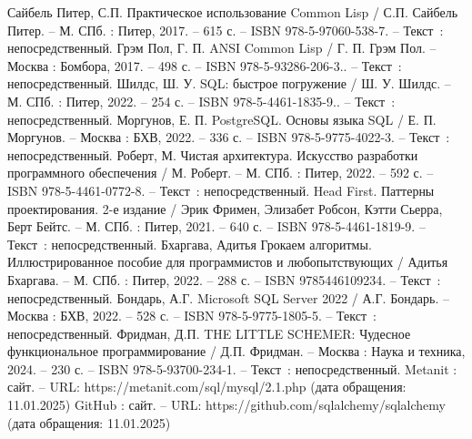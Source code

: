 
\begin{thebibliography}{9}

     Сайбель Питер, С.П. Практическое использование Common Lisp / С.П. Сайбель Питер. – М. СПб. : Питер, 2017. – 615 с. – ISBN 978-5-97060-538-7. – Текст~: непосредственный.
     Грэм Пол, Г. П. ANSI Common Lisp / Г. П. Грэм Пол. – Москва : Бомбора, 2017. – 498 с. – ISBN 978-5-93286-206-3.. – Текст~: непосредственный.
     Шилдс, Ш. У. SQL: быстрое погружение / Ш. У. Шилдс. – М. СПб. : Питер, 2022. – 254 с. – ISBN 978-5-4461-1835-9.. – Текст~: непосредственный.
    	Моргунов, Е. П. PostgreSQL. Основы языка SQL / Е. П. Моргунов. – Москва : БХВ, 2022. – 336 с. – ISBN 978-5-9775-4022-3. – Текст~: непосредственный.
		Роберт, М. Чистая архитектура. Искусство разработки программного обеспечения / М. Роберт. – М. СПб. : Питер, 2022. – 592 с. – ISBN 978-5-4461-0772-8. – Текст~: непосредственный.
		Head First. Паттерны проектирования. 2-е издание / Эрик Фримен, Элизабет Робсон, Кэтти Сьерра, Берт Бейтс. – М. СПб. : Питер, 2021. – 640 с. – ISBN 978-5-4461-1819-9. – Текст~: непосредственный.
		Бхаргава, Адитья Грокаем алгоритмы. Иллюстрированное пособие для программистов и любопытствующих / Адитья Бхаргава. – М. СПб. : Питер, 2022. – 288 с. – ISBN 9785446109234. – Текст~: непосредственный.
		Бондарь, А.Г. Microsoft SQL Server 2022 / А.Г. Бондарь. – Москва : БХВ, 2022. – 528 с. – ISBN 978-5-9775-1805-5. – Текст~: непосредственный.
		Фридман, Д.П. THE LITTLE SCHEMER: Чудесное функциональное программирование / Д.П. Фридман. – Москва : Наука и техника, 2024. – 230 с. – ISBN 978-5-93700-234-1. – Текст~: непосредственный.    
		Metanit : сайт. – URL: https://metanit.com/sql/mysql/2.1.php (дата обращения: 11.01.2025)    
		GitHub : сайт. – URL: https://github.com/sqlalchemy/sqlalchemy (дата обращения: 11.01.2025)    
\end{thebibliography}
